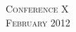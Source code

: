 \documentclass[landscape,letterpaper]{article}
\begin{document}
\pagestyle{empty} %

\noindent



\begin{center}
\textsc{\LARGE Conference X}\\ %
\textsc{\large February 2012} %
\end{center}

\end{document}
